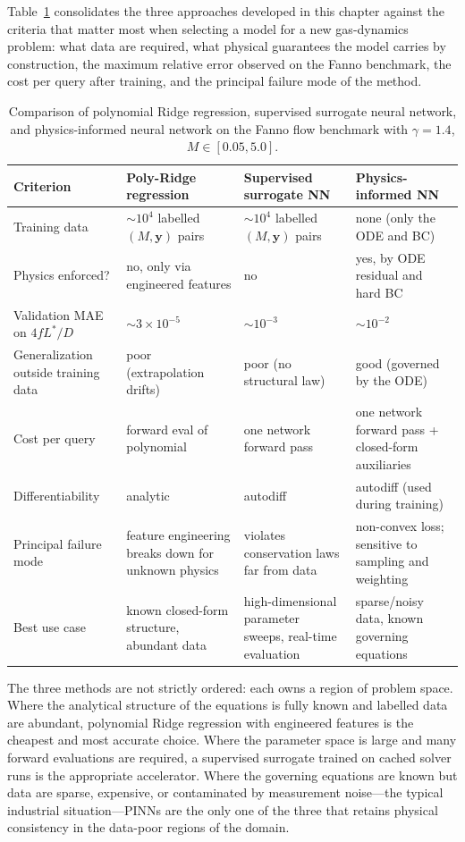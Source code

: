 \documentclass[11pt,a4paper]{report}
\begin{document}
Table~\ref{tab:method_comparison} consolidates the three approaches developed in this chapter against the criteria that matter most when selecting a model for a new gas-dynamics problem: what data are required, what physical guarantees the model carries by construction, the maximum relative error observed on the Fanno benchmark, the cost per query after training, and the principal failure mode of the method.

\begin{table}[h!]
\centering
\small
\caption{Comparison of polynomial Ridge regression, supervised surrogate neural network, and physics-informed neural network on the Fanno flow benchmark with $\gamma = 1.4$, $M \in [0.05, 5.0]$.}
\label{tab:method_comparison}
\begin{tabular}{p{3.0cm} p{3.1cm} p{3.1cm} p{3.1cm}}
\toprule
\textbf{Criterion} & \textbf{Poly-Ridge regression} & \textbf{Supervised surrogate NN} & \textbf{Physics-informed NN} \\
\midrule
Training data & $\sim\!10^{4}$ labelled $(M,\mathbf{y})$ pairs & $\sim\!10^{4}$ labelled $(M,\mathbf{y})$ pairs & none (only the ODE and BC) \\
Physics enforced? & no, only via engineered features & no & yes, by ODE residual and hard BC \\
Validation MAE on $4fL^{*}/D$ & $\sim\!3\!\times\!10^{-5}$ & $\sim\!10^{-3}$ & $\sim\!10^{-2}$ \\
Generalization outside training data & poor (extrapolation drifts) & poor (no structural law) & good (governed by the ODE) \\
Cost per query & forward eval of polynomial & one network forward pass & one network forward pass + closed-form auxiliaries \\
Differentiability & analytic & autodiff & autodiff (used during training) \\
Principal failure mode & feature engineering breaks down for unknown physics & violates conservation laws far from data & non-convex loss; sensitive to sampling and weighting \\
Best use case & known closed-form structure, abundant data & high-dimensional parameter sweeps, real-time evaluation & sparse/noisy data, known governing equations \\
\bottomrule
\end{tabular}
\end{table}

The three methods are not strictly ordered: each owns a region of problem space. Where the analytical structure of the equations is fully known and labelled data are abundant, polynomial Ridge regression with engineered features is the cheapest and most accurate choice. Where the parameter space is large and many forward evaluations are required, a supervised surrogate trained on cached solver runs is the appropriate accelerator. Where the governing equations are known but data are sparse, expensive, or contaminated by measurement noise---the typical industrial situation---PINNs are the only one of the three that retains physical consistency in the data-poor regions of the domain.
\end{document}
